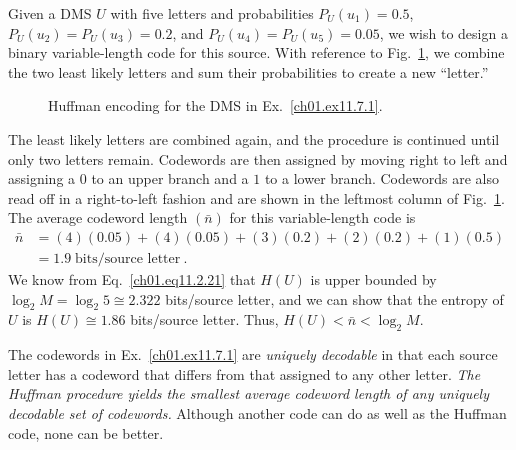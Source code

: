 \begin{example}
\label{ch01.ex11.7.1}
Given a DMS $U$ with five letters and probabilities
$P_U (u_1)=0.5$, $P_U(u_2)= P_U (u_3)= 0.2$, and
$P_U (u_4)= P_U(u_5)=0.05$, we wish to design a binary variable-length
code for this source.
With reference to Fig.~\ref{ch01.fig11.7.1}, we combine the
two least likely letters and sum their probabilities to create
a new ``letter.''
\begin{figure}[hbt] %
 \figboxes
\caption{Huffman encoding for the DMS in
         Ex.~\protect\ref{ch01.ex11.7.1}.
\label{ch01.fig11.7.1} }
\end{figure}
The least likely letters are combined again, and the procedure is
continued until only two letters remain.
Codewords are then assigned by moving right to left and assigning
a $0$ to an upper branch and a $1$ to a lower branch.
Codewords are also read off in a right-to-left fashion and are
shown in the leftmost column of Fig.~\ref{ch01.fig11.7.1}.
The average codeword length $(\bar{n})$ for this variable-length
code is
\begin{align}
\bar{n} & =
   (4)(0.05)+(4)(0.05)+(3)(0.2)+(2)(0.2)+(1)(0.5)
        \nonumber       \\
        & =
                1.9 \; \text{bits/source letter}~.
\label{ch01.eq11.7.1}
\end{align}
We know from Eq.~\eqref{ch01.eq11.2.21} that $H(U)$ is
upper bounded by $\log_2 M = \log_2 5 \cong 2.322$ bits/source letter,
and we can show that the entropy of $U$ is
$H(U) \cong 1.86$ bits/source letter.
Thus, $H(U) < \bar{n} < \log_2 M$.
\end{example}

The codewords in Ex.~\ref{ch01.ex11.7.1} are \textit{uniquely decodable}
in that each source letter has a codeword that differs from that assigned
to any other letter.
\textit{The Huffman procedure yields the smallest average codeword
length of any uniquely decodable set of codewords.}
Although another code can do as well as the Huffman code, none can be better.

